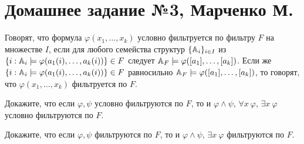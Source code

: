 


    \section*{Домашнее задание №3, Марченко М.}

    \begin{problem}[1]
        Говорят, что формула \(\varphi(x_1, \ldots, x_k)\) условно фильтруется по фильтру \(F\) на множестве \(I\), если для любого семейства структур \(\{\mathbb{A}_i\}_{i \in I}\) из \(\{i : \mathbb{A}_i \models \varphi(a_1(i), \ldots, a_k(i))\} \in F\) следует \(\mathbb{A}_F \models \varphi([a_1], \ldots, [a_k])\). Если же \(\{i : \mathbb{A}_i \models \varphi(a_1(i), \ldots, a_k(i))\} \in F\) равносильно \(\mathbb{A}_F \models \varphi([a_1], \ldots, [a_k])\), то говорят, что \(\varphi(x_1, \ldots, x_k)\) фильтруется по \(F\).

        Докажите, что если \(\varphi, \psi\) условно фильтруются по \(F\), то и \(\varphi \land \psi\), \(\forall x \ \varphi\), \(\exists x\ \varphi\) условно фильтруются по \(F\).

        Докажите, что если \(\varphi, \psi\) фильтруются по \(F\), то и \(\varphi \land \psi\), \(\exists x \ \varphi\) фильтруются по \(F\).
    \end{problem}
